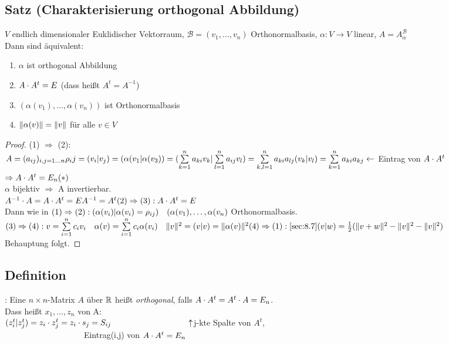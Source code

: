 \subsection{Satz (Charakterisierung orthogonal Abbildung)}\label{sec:\thesubsection}
$V$ endlich dimensionaler Euklidischer Vektorraum, $\mathcal{B} = (v_1,\ldots, v_n)$ Orthonormalbasis, $\alpha : V \to V$ linear, $A = A^\mathcal{B}_\alpha$\\
Dann sind äquivalent:\\
\begin{enumerate}[(1)]
\item $\alpha $ ist orthogonal Abbildung
\item $A \cdot A^{t} = E$ (dass hei\ss t $A^{t} = A^{-1}$)
\item $(\alpha(v_1),\ldots,\alpha(v_n))$ ist Orthonormalbasis
\item $\Vert\alpha(v)\Vert = \Vert v\Vert $ für alle $v \in V$
\end{enumerate}
\begin{proof}
(1) $\Rightarrow$ (2):\\
$A = (a_{ij})_{i,j = 1\ldots n}\\
\rho_ij = (v_i|v_j) = (\alpha(v_1|\alpha(v_3)) = (\sum\limits^{n}_{k=1} a_{ki} v_k | \sum\limits^{n}_{l=1} a_{ij} v_l) = \sum\limits^{n}_{k,l=1} a_{ki}a_{lj} (v_k|v_l) = \sum\limits^{n}_{k=1}a_{ki}a_{kj} \leftarrow$ Eintrag von $A \cdot A^t$\\
$\Rightarrow A \cd A^{t} = E_n \hfill(\ast)$\\
$\alpha$ bijektiv $\Rightarrow$ A invertierbar.\\
$A^{-1} \cdot A = A \cdot A^{t} = E\\
A^{-1} = A^t\\
(2) \Rightarrow (3): A \cdot A^{t} = E$\\
Dann wie in $(1) \Rightarrow (2):\\
(\alpha(v_i)|\alpha(v_i) = \rho_{ij})\quad (\alpha(v_1),\ldots,\alpha(v_n)$ Orthonormalbasis.\\
$(3) \Rightarrow (4):\\
v = \sum\limits^{n}_{i=1} c_iv_i\quad
\alpha(v) = \sum\limits^{n}_{i=1}c_i\alpha(v_i)\quad
\Vert v\Vert^2 = (v|v) = \Vert\alpha(v)\Vert^2\\
(4) \Rightarrow (1):\\
\ref{sec:8.7} (v|w) = \frac12 (\Vert v+w\Vert^2 - \Vert v\Vert^2 - \Vert v\Vert ^2)$\\
Behauptung folgt.
\end{proof}
\subsection{Definition}\label{sec:\thesubsection}: Eine $n \times n$-Matrix $A$ über $\mathbb{R}$ hei\ss t \emph{orthogonal}, falls $A \cdot A^{t} = A^t \cdot A =E_n$.\\
Dass hei\ss t $x_1,\ldots,z_n$ von A:\\
$(z^t_i|z^t_j) = z_i \cd z_j^t = z_i \cd s_j = S_{ij}\\
\phantom{(z^t_i|z^t_j) = z_i \cd z_j^t = z_ia}\uparrow$j-kte Spalte von $A^t$,\\$\phantom{(z^t_i|z^t_j) = z_i \cd z_j^t = z_ia}$ Eintrag(i,j) von $A \cdot A^t =E_n$
